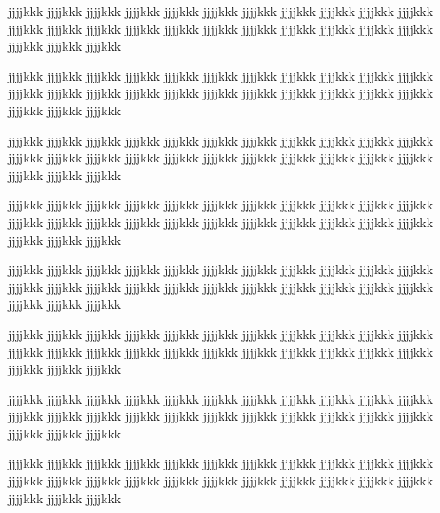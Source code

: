 jjjjkkk jjjjkkk jjjjkkk jjjjkkk jjjjkkk jjjjkkk jjjjkkk jjjjkkk jjjjkkk jjjjkkk jjjjkkk jjjjkkk jjjjkkk jjjjkkk jjjjkkk jjjjkkk jjjjkkk jjjjkkk jjjjkkk jjjjkkk jjjjkkk jjjjkkk jjjjkkk jjjjkkk jjjjkkk

jjjjkkk jjjjkkk jjjjkkk jjjjkkk jjjjkkk jjjjkkk jjjjkkk jjjjkkk jjjjkkk jjjjkkk jjjjkkk jjjjkkk jjjjkkk jjjjkkk jjjjkkk jjjjkkk jjjjkkk jjjjkkk jjjjkkk jjjjkkk jjjjkkk jjjjkkk jjjjkkk jjjjkkk jjjjkkk

jjjjkkk jjjjkkk jjjjkkk jjjjkkk jjjjkkk jjjjkkk jjjjkkk jjjjkkk jjjjkkk jjjjkkk jjjjkkk jjjjkkk jjjjkkk jjjjkkk jjjjkkk jjjjkkk jjjjkkk jjjjkkk jjjjkkk jjjjkkk jjjjkkk jjjjkkk jjjjkkk jjjjkkk jjjjkkk

jjjjkkk jjjjkkk jjjjkkk jjjjkkk jjjjkkk jjjjkkk jjjjkkk jjjjkkk jjjjkkk jjjjkkk jjjjkkk jjjjkkk jjjjkkk jjjjkkk jjjjkkk jjjjkkk jjjjkkk jjjjkkk jjjjkkk jjjjkkk jjjjkkk jjjjkkk jjjjkkk jjjjkkk jjjjkkk

jjjjkkk jjjjkkk jjjjkkk jjjjkkk jjjjkkk jjjjkkk jjjjkkk jjjjkkk jjjjkkk jjjjkkk jjjjkkk jjjjkkk jjjjkkk jjjjkkk jjjjkkk jjjjkkk jjjjkkk jjjjkkk jjjjkkk jjjjkkk jjjjkkk jjjjkkk jjjjkkk jjjjkkk jjjjkkk

jjjjkkk jjjjkkk jjjjkkk jjjjkkk jjjjkkk jjjjkkk jjjjkkk jjjjkkk jjjjkkk jjjjkkk jjjjkkk jjjjkkk jjjjkkk jjjjkkk jjjjkkk jjjjkkk jjjjkkk jjjjkkk jjjjkkk jjjjkkk jjjjkkk jjjjkkk jjjjkkk jjjjkkk jjjjkkk

jjjjkkk jjjjkkk jjjjkkk jjjjkkk jjjjkkk jjjjkkk jjjjkkk jjjjkkk jjjjkkk jjjjkkk jjjjkkk jjjjkkk jjjjkkk jjjjkkk jjjjkkk jjjjkkk jjjjkkk jjjjkkk jjjjkkk jjjjkkk jjjjkkk jjjjkkk jjjjkkk jjjjkkk jjjjkkk

jjjjkkk jjjjkkk jjjjkkk jjjjkkk jjjjkkk jjjjkkk jjjjkkk jjjjkkk jjjjkkk jjjjkkk jjjjkkk jjjjkkk jjjjkkk jjjjkkk jjjjkkk jjjjkkk jjjjkkk jjjjkkk jjjjkkk jjjjkkk jjjjkkk jjjjkkk jjjjkkk jjjjkkk jjjjkkk

